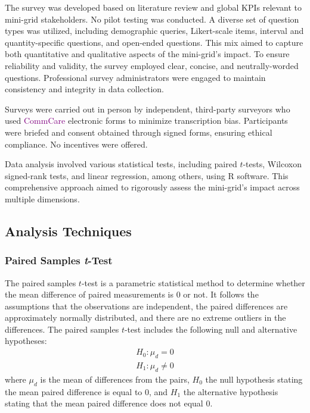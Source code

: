 The survey was developed based on literature review and global KPIs relevant to mini-grid stakeholders. No pilot testing was conducted. A diverse set of question types was utilized, including demographic queries, Likert-scale items, interval and quantity-specific questions, and open-ended questions. This mix aimed to capture both quantitative and qualitative aspects of the mini-grid's impact. To ensure reliability and validity, the survey employed clear, concise, and neutrally-worded questions. Professional survey administrators were engaged to maintain consistency and integrity in data collection.

Surveys were carried out in person by independent, third-party surveyors who used \textcolor{purple}{CommCare} electronic forms to minimize transcription bias. Participants were briefed and consent obtained through signed forms, ensuring ethical compliance. No incentives were offered.

Data analysis involved various statistical tests, including paired $t$-tests, Wilcoxon signed-rank tests, and linear regression, among others, using R software. This comprehensive approach aimed to rigorously assess the mini-grid's impact across multiple dimensions.

\subsection{Analysis Techniques}
\subsubsection{Paired Samples \textit{t}-Test}
\hfill \break
The paired samples $t$-test is a parametric statistical method to determine whether the mean difference of paired measurements is 0 or not. It follows the assumptions that the observations are independent, the paired differences are approximately normally distributed, and there are no extreme outliers in the differences. The paired samples $t$-test includes the following null and alternative hypotheses:
\begin{equation}
\begin{array}{c}
	H_0 : \mu_d = 0 \\
	H_1 :  \mu_d \neq 0
\end{array}
\end{equation}
where $\mu_d$ is the mean of differences from the pairs, $H_0$ the null hypothesis stating the mean paired difference is equal to 0, and $H_1$ the alternative hypothesis stating that the mean paired difference does not equal 0.

